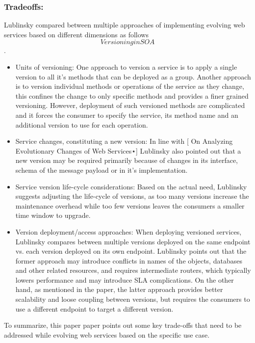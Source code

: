 \documentclass[runningheads,a4paper]{llncs}
\begin{document}
\subsubsection{Tradeoffs:} %
Lublinsky compared between multiple approaches of implementing evolving web services based on different dimensions as follows \[Versioning in SOA\].

\begin{itemize}

  \item Units of versioning: One approach to version a service is to apply a single version to all it’s methods that can be deployed as a group. Another approach is to version individual methods or operations of the service as they change, this confines the change to only specific methods and provides a finer grained versioning. However, deployment of such versioned methods are complicated and it forces the consumer to specify the service, its method name and an additional version to use for each operation.
  \item Service changes, constituting a new version: In line with [ On Analyzing Evolutionary Changes of Web Services⋆]  Lublinsky also pointed out that a new version may be required primarily because of changes in its interface, schema of the message payload or in it’s implementation.
  \item Service version life-cycle considerations: Based on the actual need, Lublinsky suggests adjusting the life-cycle of versions, as too many versions increase the maintenance overhead while too few versions leaves the consumers a smaller time window to upgrade.
  \item Version deployment/access approaches: When deploying versioned services, Lublinsky compares between multiple versions deployed on the same endpoint vs. each version deployed on its own endpoint. Lublinsky points out that the former approach may introduce conflicts in names of the objects, databases and other related resources, and requires intermediate routers, which typically lowers performance and may introduce SLA complications. On the other hand, as mentioned in the paper, the latter approach provides better scalability and loose coupling between versions, but requires the consumers to use a different endpoint to target a different version.

\end{itemize}

To summarize, this paper paper points out some key trade-offs that need to be addressed while evolving web services based on the specific use case.
\end{document}
